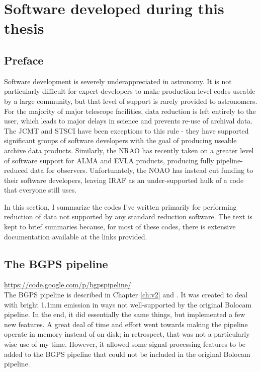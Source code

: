 
\chapter{Software developed during this thesis}
\label{ch:software}
\section{Preface}
Software development is severely underappreciated in astronomy.  It is not
particularly difficult for expert developers to make production-level codes
useable by a large community, but that level of support is rarely provided to
astronomers.  For the majority of major telescope facilities, data reduction is
left entirely to the user, which leads to major delays in science and prevents
re-use of archival data.  The JCMT and STSCI have been exceptions to this rule
- they have supported significant groups of software developers with the goal
of producing useable archive data products.  Similarly, the NRAO has recently
taken on a greater level of software support for ALMA and EVLA products,
producing fully pipeline-reduced data for observers.  Unfortunately, the NOAO
has instead cut funding to their software developers, leaving IRAF as an
under-supported hulk of a code that everyone still uses. 

In this section, I summarize the codes I've written primarily for performing
reduction of data not supported by any standard reduction software.  The text
is kept to brief summaries because, for most of these codes, there is extensive
documentation available at the links provided.

\section{The BGPS pipeline}
\label{sec:bgpspipeline}
\url{https://code.google.com/p/bgpspipeline/} \\
The BGPS pipeline is described in Chapter \ref{ch:v2} and \citet{Aguirre2011}.
It was created to deal with bright 1.1mm emission in ways not well-supported 
by the original Bolocam pipeline.  In the end, it did essentially the same
things, but implemented a few new features.  A great deal of time and effort
went towards making the pipeline operate in memory instead of on disk; in
retrospect, that was not a particularly wise use of my time.  However, it
allowed some signal-processing features to be added to the BGPS pipeline that
could not be included in the original Bolocam pipeline.  

